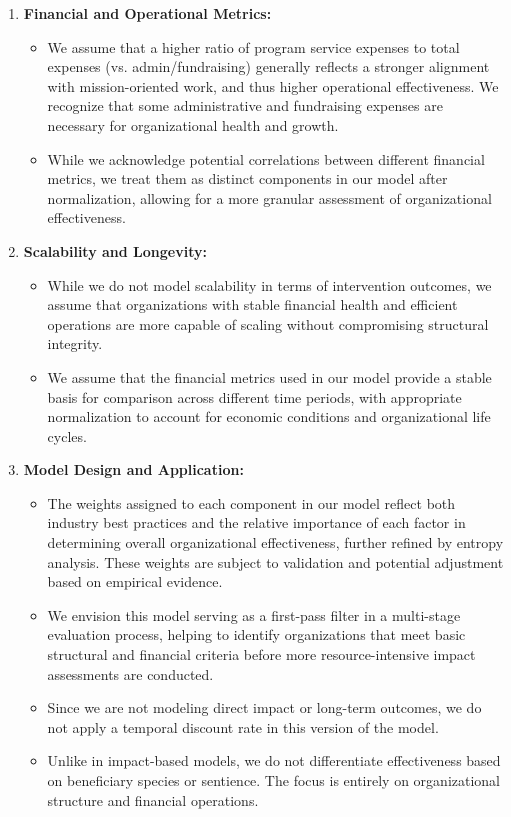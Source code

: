 \documentclass[12pt]{article}
\begin{document}
\begin{enumerate}[label=\arabic*.]
    \item \textbf{Financial and Operational Metrics:}
        \begin{itemize}[label=\textbullet]
            \item We assume that a higher ratio of program service expenses to total expenses (vs. admin/fundraising) generally reflects a stronger alignment with mission-oriented work, and thus higher operational effectiveness. We recognize that some administrative and fundraising expenses are necessary for organizational health and growth.
            \item While we acknowledge potential correlations between different financial metrics, we treat them as distinct components in our model after normalization, allowing for a more granular assessment of organizational effectiveness.
        \end{itemize}

    \item \textbf{Scalability and Longevity:}
        \begin{itemize}[label=\textbullet]
            \item While we do not model scalability in terms of intervention outcomes, we assume that organizations with stable financial health and efficient operations are more capable of scaling without compromising structural integrity.
            \item We assume that the financial metrics used in our model provide a stable basis for comparison across different time periods, with appropriate normalization to account for economic conditions and organizational life cycles.
        \end{itemize}

    \item \textbf{Model Design and Application:}
        \begin{itemize}[label=\textbullet]
            \item The weights assigned to each component in our model reflect both industry best practices and the relative importance of each factor in determining overall organizational effectiveness, further refined by entropy analysis. These weights are subject to validation and potential adjustment based on empirical evidence.
            \item We envision this model serving as a first-pass filter in a multi-stage evaluation process, helping to identify organizations that meet basic structural and financial criteria before more resource-intensive impact assessments are conducted.
            \item Since we are not modeling direct impact or long-term outcomes, we do not apply a temporal discount rate in this version of the model.
            \item Unlike in impact-based models, we do not differentiate effectiveness based on beneficiary species or sentience. The focus is entirely on organizational structure and financial operations.
        \end{itemize}
\end{enumerate}
\end{document}
